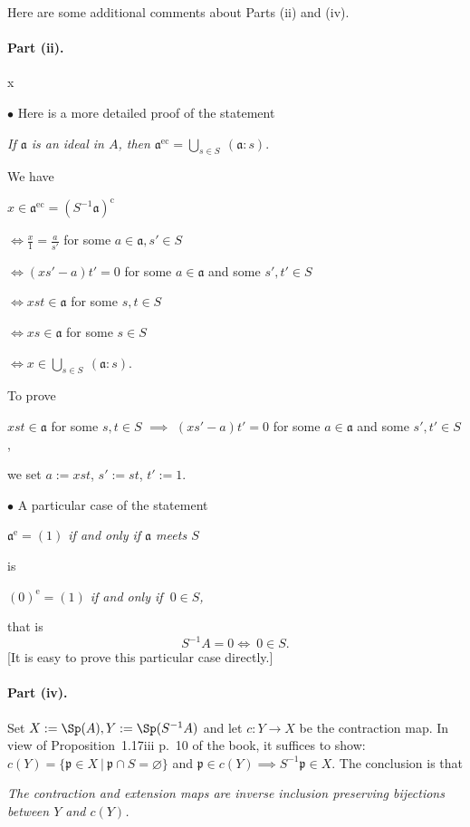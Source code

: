 \documentclass[12pt,letterpaper]{article}%
\newcommand{\oo}{\operatorname}\newcommand{\ooo}{\operatorname*}
\newcommand{\mf}{\mathfrak}
\newcommand{\aaa}{\mf a}
\newcommand{\ppp}{\mf p}
\newcommand{\bu}{\bullet}
\newcommand{\ds}{\displaystyle}
\newcommand{\nn}{\noindent}
\begin{document}
Here are some additional comments about Parts (ii) and (iv).

\paragraph{Part (ii).}\phantom x

\nn$\bu$ Here is a more detailed proof of the statement 

\emph{If $\aaa$ is an ideal in $A$, then $\aaa^{\oo{ec}}=\bigcup_{s\in S}\ (\aaa:s)$}.

\nn We have 

$x\in\aaa^{\oo{ec}}=(S^{-1}\aaa)^{\oo c}$

$\ds\iff\frac{x}{1}=\frac{a}{s'}$ for some $a\in\aaa,s'\in S$ 

$\iff(xs'-a)t'=0$ for some $a\in\aaa$ and some $s',t'\in S$ 

$\iff xst\in\aaa$ for some $s,t\in S$

$\iff xs\in\aaa$ for some $s\in S$

$\iff x\in\bigcup_{s\in S}\ (\aaa:s)$.

\nn To prove 

$xst\in\aaa$ for some $s,t\in S$ $\implies$ $(xs'-a)t'=0$ for some $a\in\aaa$ and some $s',t'\in S$, 

\nn we set $a:=xst$, $s':=st$, $t':=1$. 

\nn$\bu$ A particular case of the statement 

\centerline{\emph{$\aaa^{\oo e}=(1)$ if and only if $\aaa$ meets $S$}} 

\nn is 

\centerline{\emph{$(0)^{\oo e}=(1)$ if and only if $\ 0\in S$,}}

\nn that is 
\begin{equation}\label{s-1a}
S^{-1}A=0\iff\ 0\in S. 
\end{equation}
[It is easy to prove this particular case directly.] 

\paragraph{Part (iv).}\label{prcor}%

Set $X:=\Sp(A),Y:=\Sp(S^{-1}A)$ and let $c:Y\to X$ be the contraction map. In view of Proposition~1.17iii p.~10 of the book, it suffices to show: $c(Y)=\{\ppp\in X\ |\ \ppp\cap S=\varnothing\}$ and $\ppp\in c(Y)\implies S^{-1}\ppp\in X$. The conclusion is that 

\nn\emph{The contraction and extension maps are inverse inclusion preserving bijections between $Y$ and $c(Y)$.} 
\end{document}
